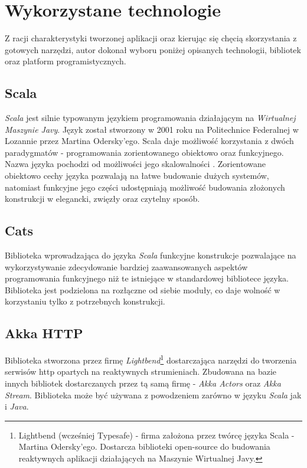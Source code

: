 \documentclass[../main.tex]{subfiles}
\begin{document}
\section{Wykorzystane technologie}
Z racji charakterystyki tworzonej aplikacji oraz kierując się chęcią skorzystania z gotowych narzędzi, autor dokonał wyboru poniżej opisanych technologii, bibliotek oraz platform programistycznych.

\subsection{Scala}
\textit{Scala} jest silnie typowanym językiem programowania działającym na \textit{Wirtualnej Maszynie Javy}. Język został stworzony w 2001 roku na Politechnice Federalnej w Lozannie przez Martina Odersky'ego. Scala daje możliwość korzystania z dwóch paradygmatów - programowania zorientowanego obiektowo oraz funkcyjnego. Nazwa języka pochodzi od możliwości jego skalowalności \cite{BOOK:ProgrammingInScala}. Zorientowane obiektowo cechy języka pozwalają na łatwe budowanie dużych systemów, natomiast funkcyjne jego części udostępniają możliwość budowania złożonych konstrukcji w elegancki, zwięzły oraz czytelny sposób.

\subsection{Cats}
Biblioteka wprowadzająca do języka \textit{Scala} funkcyjne konstrukcje pozwalające na wykorzystywanie zdecydowanie bardziej zaawansowanych aspektów programowania funkcyjnego niż te istniejące w standardowej bibliotece języka. Biblioteka jest podzielona na rozłączne od siebie moduły, co daje wolność w korzystaniu tylko z potrzebnych konstrukcji. \cite{WEBSITE:CatsDataTypes, BOOK:ScalaWithCats}

\subsection{Akka HTTP}
Biblioteka stworzona przez firmę \textit{Lightbend}\footnote{Lightbend (wcześniej Typesafe) - firma założona przez twórcę języka Scala - Martina Odersky'ego. Dostarcza biblioteki open-source do budowania reaktywnych aplikacji działających na Maszynie Wirtualnej Javy.} dostarczająca narzędzi do tworzenia serwisów http opartych na reaktywnych strumieniach. Zbudowana na bazie innych bibliotek dostarczanych przez tą samą firmę - \textit{Akka Actors} oraz \textit{Akka Stream}. Biblioteka może być używana z powodzeniem zarówno w języku \textit{Scala} jak i \textit{Java}.
\end{document}
